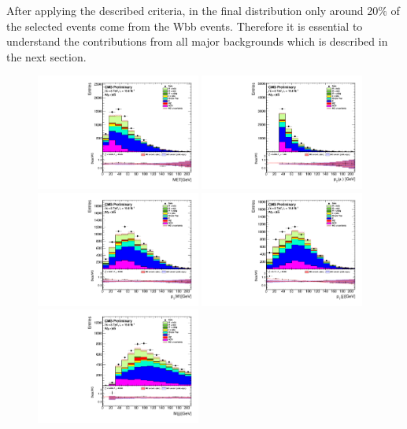 After applying the described criteria, in the final distribution only around 20$\%$ of the selected events come from the Wbb events. Therefore it is essential to understand the contributions from all major backgrounds which is described in the next section. 
\begin{figure}[htbp]
	\centering
		\includegraphics[width=0.48\textwidth]{Figures/Results/Muon/prefit/Wbb_GetMET_doQCD1.pdf}
		\includegraphics[width=0.48\textwidth]{Figures/Results/Muon/prefit/Wbb_vLepton_pt_doQCD1.pdf}
		\includegraphics[width=0.48\textwidth]{Figures/Results/Muon/prefit/Wbb_GetWpt_doQCD1.pdf}
		\includegraphics[width=0.48\textwidth]{Figures/Results/Muon/prefit/Wbb_H_pt_doQCD1.pdf}
		\includegraphics[width=0.48\textwidth]{Figures/Results/Muon/prefit/Wbb_H_mass_doQCD1.pdf}

\end{figure}
